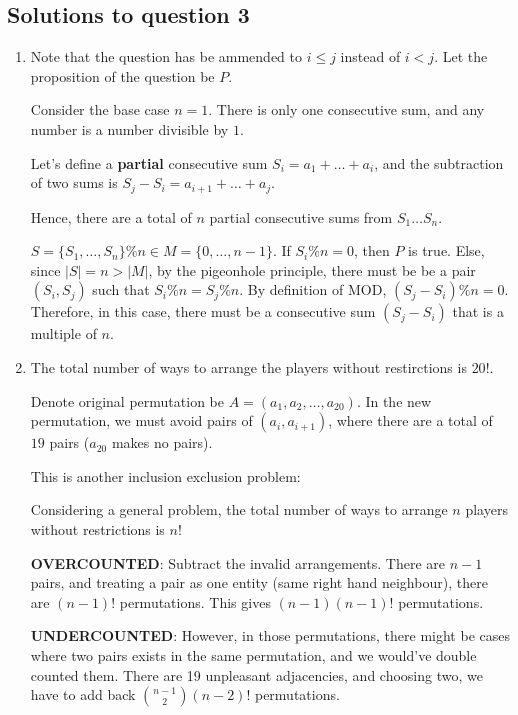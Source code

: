 \documentclass{article}
\begin{document}
\subsection*{Solutions to question 3}
\begin{enumerate}[label=(\alph*)]
    \item Note that the question has be ammended to $i \leq j$ instead of $i < j$. Let the proposition of the question be $P$.

          Consider the base case $n=1$. There is only one consecutive sum, and any number is a number divisible by $1$.

          Let's define a \textbf{partial} consecutive sum $S_i = a_1 + \ldots + a_i$, and the subtraction of two sums is $S_j - S_i = a_{i+1} + \ldots + a_j$.

          Hence, there are a total of $n$ partial consecutive sums from $S_1 \dots S_n$.

          $S=\{S_1,\ldots,S_n\} \% n \in M=\{0,\ldots,n-1\}$. If $S_i \% n = 0$, then $P$ is true. Else, since $|S| = n > |M|$, by the pigeonhole principle, there must be be a pair $(S_i,S_j)$ such that $S_i \% n = S_j \% n$. By definition of MOD, $(S_j - S_i) \% n = 0$. Therefore, in this case, there must be a consecutive sum $(S_j-S_i)$ that is a multiple of $n$.

    \item The total number of ways to arrange the players without restirctions is $20!$.

          Denote original permutation be $A=(a_1,a_2,\ldots,a_{20})$. In the new permutation, we must avoid pairs of $(a_i,a_{i+1})$, where there are a total of $19$ pairs ($a_{20}$ makes no pairs).

          This is another inclusion exclusion problem:

          Considering a general problem, the total number of ways to arrange $n$ players without restrictions is $n!$

          \textbf{OVERCOUNTED}: Subtract the invalid arrangements. There are $n-1$ pairs, and treating a pair as one entity (same right hand neighbour), there are $(n-1)!$ permutations. This gives $(n-1)(n-1)!$ permutations.

          \textbf{UNDERCOUNTED}: However, in those permutations, there might be cases where two pairs exists in the same permutation, and we would've double counted them. There are 19 unpleasant adjacencies, and choosing two, we have to add back $\binom{n-1}{2}(n-2)!$ permutations.


\end{enumerate}
\end{document}
